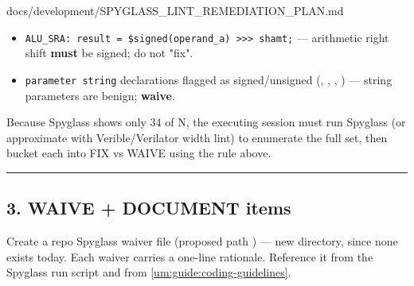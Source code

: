 \begin{relocated}{docs/development/SPYGLASS_LINT_REMEDIATION_PLAN.md}
\begin{enumerate}
  \begin{itemize}
  \tightlist
  \item
    \texttt{ALU\_\allowbreak{}SRA:\allowbreak{}\ result\ =\allowbreak{}\ \$signed(operand\_\allowbreak{}a)\ >>>\ shamt;}
    --- arithmetic right shift \textbf{must} be signed; do not "fix".
  \item
    \texttt{parameter\ string} declarations flagged as
    signed/\allowbreak{}unsigned (,
    , ,
    ) --- string parameters are benign;
    \textbf{waive}.
  \end{itemize}
\end{enumerate}

Because Spyglass shows only 34 of N, the executing session must run
Spyglass (or approximate with Verible/\allowbreak{}Verilator width lint)
to enumerate the full set, then bucket each into FIX vs WAIVE using the
rule above.

\begin{center}\rule{0.5\linewidth}{0.5pt}\end{center}

\subsection{3. WAIVE + DOCUMENT items}\label{um:guide:spyglass-lint-remediation:3-waive-document-items}

Create a repo Spyglass waiver file (proposed path
\textbf{}) --- new directory, since none
exists today. Each waiver carries a one-line rationale. Reference it
from the Spyglass run script and from \cref{um:guide:coding-guidelines}.

{\footnotesize\setlength{\tabcolsep}{3pt}

}
\end{relocated}
